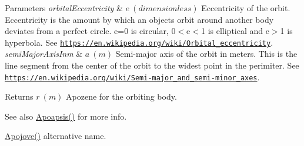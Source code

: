 \begin{DoxyParams}{Parameters}
{\em orbital\+Eccentricity} & $ e\ (dimensionless)$ Eccentricity of the orbit. Eccentricity is the amount by which an objects orbit around another body deviates from a perfect circle. e=0 is circular, 0$<$e$<$1 is elliptical and e$>$1 is hyperbola. See \href{https://en.wikipedia.org/wiki/Orbital_eccentricity}{\tt https\+://en.\+wikipedia.\+org/wiki/\+Orbital\+\_\+eccentricity}. \\
\hline
{\em semi\+Major\+Axis\+Inm} & $ a\ (m)$ Semi-\/major axis of the orbit in meters. This is the line segment from the center of the orbit to the widest point in the perimiter. See \href{https://en.wikipedia.org/wiki/Semi-major_and_semi-minor_axes}{\tt https\+://en.\+wikipedia.\+org/wiki/\+Semi-\/major\+\_\+and\+\_\+semi-\/minor\+\_\+axes}. \\
\hline
\end{DoxyParams}
\begin{DoxyReturn}{Returns}
$ r\ (m)$ Apozene for the orbiting body. 
\end{DoxyReturn}
\begin{DoxySeeAlso}{See also}
\mbox{\hyperlink{group___e_g_x_phys-_apoapsis_gafd08a2d1d64886e7bb9bcb7ff65bc3ea}{Apoapsis()}} for more info. 

\mbox{\hyperlink{group___e_g_x_phys-_apoapsis_gad2a2021d43526fc752fe87beff789b28}{Apojove()}} alternative name. 
\end{DoxySeeAlso}
